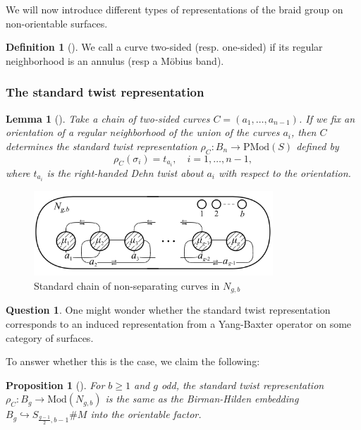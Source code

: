 \documentclass[reqno]{amsart}
\newtheorem{lemma}[theorem]{Lemma}
\newtheorem{proposition}[theorem]{Proposition}
\theoremstyle{definition}
\newtheorem{definition}[theorem]{Definition}
\newtheorem{question}[theorem]{Question}
\theoremstyle{remark}
\newcommand{\Mod}{{\mathrm{Mod}}}
\newcommand{\PMod}{{\mathrm{PMod}}}
\begin{document}
We will now introduce different types of representations
of the braid group on non-orientable surfaces.


\begin{definition}[]
We call a curve two-sided (resp. one-sided) if its regular neighborhood is an
annulus (resp a Möbius band).
\end{definition}

\subsubsection{The standard twist representation}

\begin{lemma}[]
    Take a chain of two-sided curves
    $C = \left( a_1, \ldots, a_{n-1} \right) $.
    If we fix an orientation of a regular neighborhood
    of the union of the curves $a_i$, then
    $C$ determines \textit{the standard twist representation}
    $\rho_{C} \colon B_n \to \PMod (S)$ defined by
    \[
    \rho_C \left( \sigma_i \right) = t_{a_i}, \quad
    i = 1, \ldots, n-1,
    \] 
    where $t_{a_i}$ is the right-handed Dehn twist
    about $a_i$ with respect to the orientation.
\end{lemma}

\begin{figure}[H]
    \centering
    \includegraphics[width=0.8\textwidth]{standard-chain.png}
    \caption{Standard chain of non-separating curves
    in $N_{g,b}$}
    \label{fig:standard-chain-png}
\end{figure}

\begin{question}
    One might wonder whether the standard twist representation
    corresponds to an induced representation from a Yang-Baxter
    operator on some category of surfaces.
\end{question}

To answer whether this is the case, we claim the following:

\begin{proposition}[]
    For $b\ge 1$ and
    $g$ odd, the standard twist representation
    $\rho_{C} \colon B_g \to \Mod (N_{g,b})$ is the
    same as the Birman-Hilden embedding
    $B_g \hookrightarrow S_{\frac{g-1}{2}, b-1} \# M $
    into the orientable factor.
\end{proposition}
\end{document}
